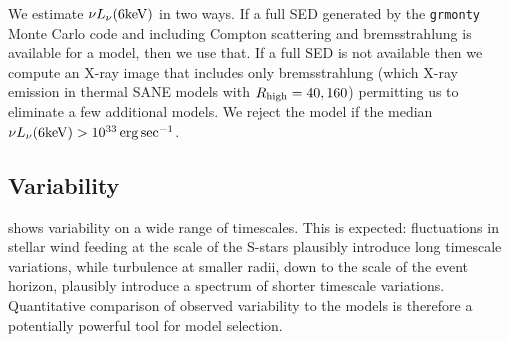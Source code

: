 We estimate $\nu L_\nu (6 {\rm keV})$ in two ways.  If a full SED generated by the {\tt grmonty} Monte Carlo code \citep[][also Wong et al. 2022, Davelaar et al. 2022]{2009ApJS..184..387D} and including Compton scattering and bremsstrahlung is available for a model, then we use that.  If a full SED is not available then we compute an X-ray image that includes only bremsstrahlung (which X-ray emission in thermal SANE models with $R_\mathrm{high} = 40, 160$) permitting us to eliminate a few additional models.  We reject the model if the median $\nu L_\nu (6 {\rm keV}) > 10^{33} \,\mathrm{erg} \sec^{-1}$.  

\subsection{Variability}

%


\sgra shows variability on a wide range of timescales.  This is expected: fluctuations in stellar wind feeding at the scale of the S-stars plausibly introduce long timescale variations, while turbulence at smaller radii, down to the scale of the event horizon, plausibly introduce a spectrum of shorter timescale variations.  Quantitative comparison of observed variability to the models is therefore a potentially powerful tool for model selection.

